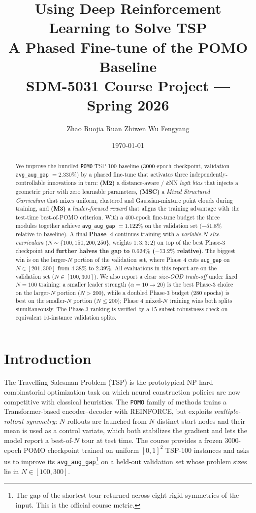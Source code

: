 \documentclass[11pt,a4paper]{article}
\title{\textbf{Using Deep Reinforcement Learning to Solve TSP\\
A Phased Fine-tune of the POMO Baseline}\\
\large SDM-5031 Course Project --- Spring 2026}
\author{Zhao Ruojia \quad Ruan Zhiwen \quad Wu Fengyang}
\date{\today}
\begin{document}
\maketitle

\begin{abstract}
We improve the bundled \texttt{POMO} TSP-100 baseline (3000-epoch checkpoint, validation
\texttt{avg\_aug\_gap} $=2.330\%$) by a phased fine-tune that activates three
independently-controllable innovations in turn: \textbf{(M2)} a distance-aware /
$k$NN \emph{logit bias} that injects a geometric prior with zero learnable
parameters, \textbf{(MSC)} a \emph{Mixed Structured Curriculum} that mixes
uniform, clustered and Gaussian-mixture point clouds during training, and
\textbf{(M3)} a \emph{leader-focused reward} that aligns the training advantage
with the test-time best-of-POMO criterion. With a 400-epoch fine-tune
budget the three modules together achieve \texttt{avg\_aug\_gap} $=1.122\%$ on
the validation set ($-51.8\%$ relative to baseline). A final
\textbf{Phase~4} continues training with a \emph{variable-$N$ size curriculum}
($N\!\sim\!\{100,150,200,250\}$, weights $1{:}3{:}3{:}2$) on top of the best
Phase-3 checkpoint and \textbf{further halves the gap to
$\mathbf{0.624\%}$ ($\mathbf{-73.2\%}$ relative)}. The biggest win is on the
larger-$N$ portion of the validation set, where Phase 4 cuts \texttt{aug\_gap}
on $N\!\in\![201,300]$ from $4.38\%$ to $2.39\%$. All evaluations in this
report are on the validation set ($N\!\in\![100,300]$). We also report a clear
\emph{size-OOD trade-off} under fixed $N\!=\!100$ training: a smaller leader
strength ($\alpha=10{\to}20$) is the best Phase-3 choice on the larger-$N$
portion ($N>200$), while a doubled Phase-3 budget (280 epochs) is best on the
smaller-$N$ portion ($N\le 200$); Phase 4 mixed-$N$ training wins both
splits simultaneously. The Phase-3 ranking is verified by a $15$-subset
robustness check on equivalent 10-instance validation splits.
\end{abstract}

\section{Introduction}

The Travelling Salesman Problem (TSP) is the prototypical NP-hard combinatorial
optimization task on which neural construction policies are now competitive
with classical heuristics. The \texttt{POMO} family of methods \cite{POMO}
trains a Transformer-based encoder--decoder with REINFORCE, but exploits
\emph{multiple-rollout symmetry}: $N$ rollouts are launched from $N$ distinct
start nodes and their mean is used as a control variate, which both stabilizes
the gradient and lets the model report a best-of-$N$ tour at test time. The
course provides a frozen 3000-epoch POMO checkpoint trained on uniform
$[0,1]^2$ TSP-100 instances and asks us to improve its
\texttt{avg\_aug\_gap}\footnote{The gap of the shortest tour returned across
eight rigid symmetries of the input. This is the official course metric.}
on a held-out validation set whose problem sizes lie in $N\!\in\![100,300]$.
\end{document}
